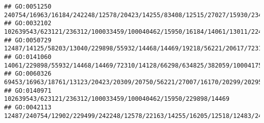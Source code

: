\documentclass[
]{article}
\begin{document}
\begin{verbatim}
## GO:0051250                                                                                                                                                                                                                                                      240754/16963/16184/242248/12578/20423/14255/83408/12515/27027/15930/234199/57916/20666/100043314/208154/57757/14960/16149/14419/60533/58205/20371/12229
## GO:0032102                                                                                                                                          102639543/623121/236312/100033459/100040462/15950/16184/14061/13011/22417/230959/100038882/246727/23961/23960/246730/109648/80782/16643/27007/243958/18791/434341/237310/16160/80861/110168/81799/71753/106014/54483/547253/19876/100503895/21354/21355/11629/20371
## GO:0050729                                                                                                                                                                                                                                                                       12487/14125/58203/13040/229898/55932/14468/14469/19218/56221/20617/72310/16170/244202/15930/17394/637515/20304/12775/21943/54483/12229
## GO:0141060                                                                                                                                                                                                                                                            14061/229898/55932/14468/14469/72310/14128/66298/634825/382059/100041759/13237/13239/626682/626708/100041952/503491/20299/20295/18126/20307/56838
## GO:0060326                                                                                                                                                                                                    69453/16963/18761/13123/20423/20309/20750/56221/27007/16170/20299/20295/76527/12145/252837/12773/23832/20306/20307/20304/20303/12775/12777/56838/21943/110168/321019/66793/245195/12458/11629/16149/12766
## GO:0140971                                                                                                                                                                                                                                                                                                                                               102639543/623121/236312/100033459/100040462/15950/229898/14469
## GO:0042113                                                                                                                                                                                                       12487/240754/12902/229499/242248/12578/22163/14255/16205/12518/12483/243958/272382/11833/12478/24099/12145/18985/81897/57916/15985/17079/321019/72049/208154/12458/69816/16149/12482/20371/16186/12229

\end{verbatim}
\end{document}

